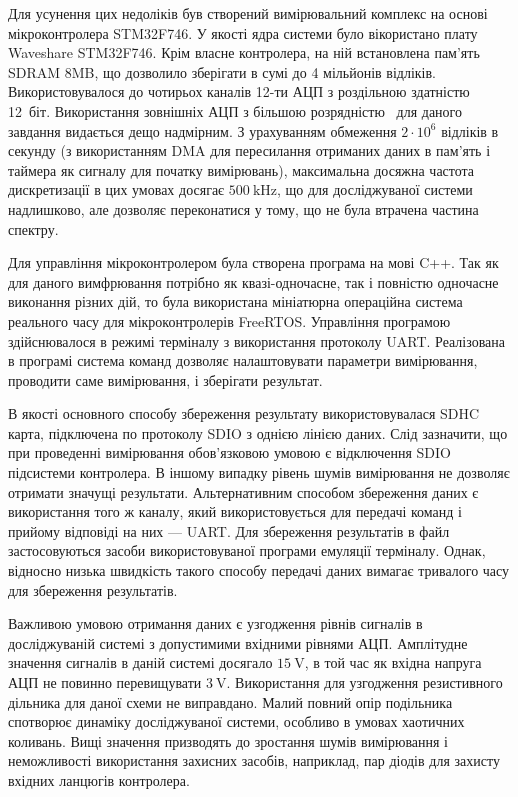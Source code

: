 Для усунення цих недоліків був створений вимірювальний
комплекс на основі мікроконтролера STM32F746. У якості ядра системи було вікористано
плату Waveshare STM32F746. Крім власне контролера, на ній
встановлена пам'ять SDRAM 8MB, що дозволило зберігати
в сумі до 4 мільйонів відліків. Використовувалося до чотирьох
каналів 12-ти АЦП з роздільною здатністю 12~біт. Використання
зовнішніх АЦП з більшою розрядністю~\cite{atu_st104a} для даного
завдання видається дещо надмірним. З урахуванням обмеження
$ 2 \cdot 10 ^ 6 $ відліків в секунду (з використанням DMA для пересилання
отриманих даних в пам'ять і таймера як сигналу для початку
вимірювань), максимальна досяжна частота дискретизації в цих
умовах досягає
$ \SI{500}{\kilo \hertz} $, що для досліджуваної системи надлишково,
але дозволяє переконатися у тому, що не була втрачена частина
спектру.

Для управління мікроконтролером була створена програма на
мові C++. Так як для даного вимфрювання потрібно як квазі-одночасне,
так і повністю одночасне виконання різних дій, то була
використана мініатюрна операційна система реального часу для
мікроконтролерів FreeRTOS. Управління програмою здійснювалося
в режимі терміналу з використання протоколу UART. Реалізована
в програмі система команд дозволяє налаштовувати параметри
вимірювання, проводити саме вимірювання, і зберігати результат.

В якості основного способу збереження результату
використовувалася SDHC карта, підключена по протоколу SDIO з однією
лінією даних. Слід зазначити, що при проведенні вимірювання
обов'язковою умовою є відключення SDIO підсистеми контролера. В
іншому випадку рівень шумів вимірювання не дозволяє отримати
значущі результати. Альтернативним способом збереження
даних є використання того ж каналу, який використовується для
передачі команд і прийому відповіді на них --- UART. Для збереження
результатів в файл застосовуються засоби використовуваної
програми емуляції терміналу. Однак, відносно низька швидкість
такого способу передачі даних вимагає тривалого часу для
збереження результатів.

Важливою умовою отримання даних є узгодження рівнів сигналів
в досліджуваній системі з допустимими вхідними рівнями
АЦП. Амплітудне значення сигналів в даній системі досягало
$ \SI{15}{\volt} $, в той час як вхідна напруга АЦП не повинно
перевищувати
$ \SI{3}{\volt} $. Використання для узгодження резистивного дільника
для даної схеми не виправдано. Малий повний опір подільника
спотворює динаміку досліджуваної системи, особливо в умовах
хаотичних коливань. Вищі значення призводять до зростання шумів
вимірювання і неможливості використання захисних засобів,
наприклад, пар діодів для захисту вхідних ланцюгів контролера.

